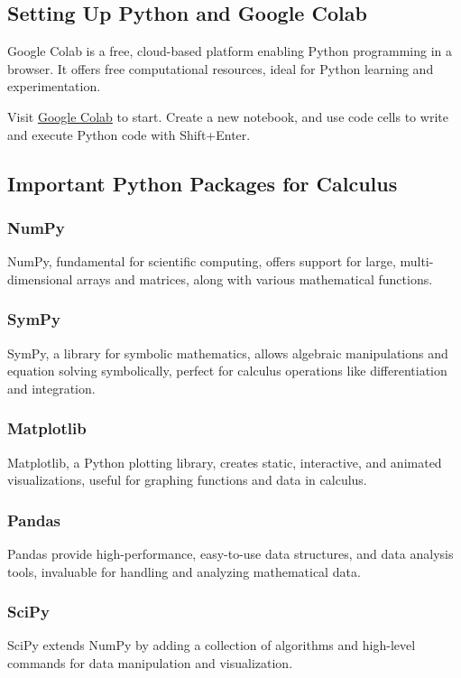 \documentclass[a4paper,12pt]{book}
\begin{document}
\subsection*{Setting Up Python and Google Colab}

Google Colab is a free, cloud-based platform enabling Python programming in a browser. It offers free computational resources, ideal for Python learning and experimentation.

Visit \href{https://colab.research.google.com/}{Google Colab} to start. Create a new notebook, and use code cells to write and execute Python code with Shift+Enter.

\subsection*{Important Python Packages for Calculus}

\subsubsection*{NumPy}
NumPy, fundamental for scientific computing, offers support for large, multi-dimensional arrays and matrices, along with various mathematical functions.

\subsubsection*{SymPy}
SymPy, a library for symbolic mathematics, allows algebraic manipulations and equation solving symbolically, perfect for calculus operations like differentiation and integration.

\subsubsection*{Matplotlib}
Matplotlib, a Python plotting library, creates static, interactive, and animated visualizations, useful for graphing functions and data in calculus.

\subsubsection*{Pandas}
Pandas provide high-performance, easy-to-use data structures, and data analysis tools, invaluable for handling and analyzing mathematical data.

\subsubsection*{SciPy}
SciPy extends NumPy by adding a collection of algorithms and high-level commands for data manipulation and visualization.
\end{document}
